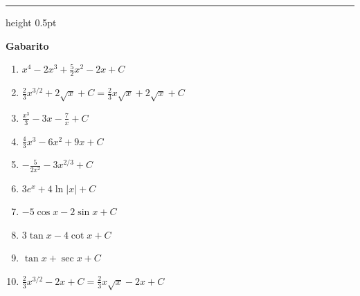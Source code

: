 \documentclass[12pt,a4paper]{article}
\begin{document}
\vspace{0.8cm}
\hrule height 0.5pt
\vspace{0.4cm}

\begin{center}
    {\Large \textbf{\color{primary} Gabarito}}
\end{center}

\vspace{0.2cm}

\begin{enumerate}[label=\textbf{\arabic*.}, itemsep=0.6em, leftmargin=*]
    \item $x^4 - 2x^3 + \frac{5}{2}x^2 - 2x + C$
    \item $\frac{2}{3}x^{3/2} + 2\sqrt{x} + C = \frac{2}{3}x\sqrt{x} + 2\sqrt{x} + C$
    \item $\frac{x^3}{3} - 3x - \frac{7}{x} + C$
    \item $\frac{4}{3}x^3 - 6x^2 + 9x + C$
    \item $-\frac{5}{2x^2} - 3x^{2/3} + C$
    \item $3e^x + 4\ln|x| + C$
    \item $-5\cos x - 2\sin x + C$
    \item $3\tan x - 4\cot x + C$
    \item $\tan x + \sec x + C$
    \item $\frac{2}{3}x^{3/2} - 2x + C = \frac{2}{3}x\sqrt{x} - 2x + C$
\end{enumerate}
\end{document}
